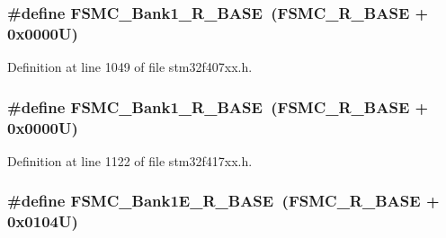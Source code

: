 \subsubsection[{\texorpdfstring{F\+S\+M\+C\+\_\+\+Bank1\+\_\+\+R\+\_\+\+B\+A\+SE}{FSMC_Bank1_R_BASE}}]{\setlength{\rightskip}{0pt plus 5cm}\#define F\+S\+M\+C\+\_\+\+Bank1\+\_\+\+R\+\_\+\+B\+A\+SE~({\bf F\+S\+M\+C\+\_\+\+R\+\_\+\+B\+A\+SE} + 0x0000\+U)}\hypertarget{group___peripheral__registers__structures_gad196fe6f5e4041b201d14f43508c06d2}{}\label{group___peripheral__registers__structures_gad196fe6f5e4041b201d14f43508c06d2}


Definition at line 1049 of file stm32f407xx.\+h.

\subsubsection[{\texorpdfstring{F\+S\+M\+C\+\_\+\+Bank1\+\_\+\+R\+\_\+\+B\+A\+SE}{FSMC_Bank1_R_BASE}}]{\setlength{\rightskip}{0pt plus 5cm}\#define F\+S\+M\+C\+\_\+\+Bank1\+\_\+\+R\+\_\+\+B\+A\+SE~({\bf F\+S\+M\+C\+\_\+\+R\+\_\+\+B\+A\+SE} + 0x0000\+U)}\hypertarget{group___peripheral__registers__structures_gad196fe6f5e4041b201d14f43508c06d2}{}\label{group___peripheral__registers__structures_gad196fe6f5e4041b201d14f43508c06d2}


Definition at line 1122 of file stm32f417xx.\+h.

\subsubsection[{\texorpdfstring{F\+S\+M\+C\+\_\+\+Bank1\+E\+\_\+\+R\+\_\+\+B\+A\+SE}{FSMC_Bank1E_R_BASE}}]{\setlength{\rightskip}{0pt plus 5cm}\#define F\+S\+M\+C\+\_\+\+Bank1\+E\+\_\+\+R\+\_\+\+B\+A\+SE~({\bf F\+S\+M\+C\+\_\+\+R\+\_\+\+B\+A\+SE} + 0x0104\+U)}\hypertarget{group___peripheral__registers__structures_gaea182589c84aee30b7f735474d8774e2}{}\label{group___peripheral__registers__structures_gaea182589c84aee30b7f735474d8774e2}


